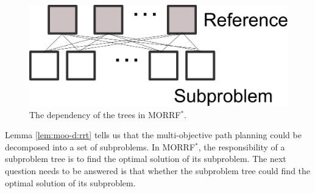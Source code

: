 \documentclass[conference]{IEEEtran}
\newtheorem{lem}{Lemma}
\begin{document}

\begin{figure}
\centering
\includegraphics[width=0.7\linewidth]{fig/dependency}
\caption{The dependency of the trees in MORRF$^{*}$.}
\label{fig:dependency}
\end{figure}

Lemma \ref{lem:moo-d:rrt} tells us that the multi-objective path planning could be decomposed into a set of subproblems.
In MORRF$^{*}$, the responsibility of a subproblem tree is to find the optimal solution of its subproblem.
The next question needs to be answered is that whether the subproblem tree could find the optimal solution of its subproblem.
\end{document}
